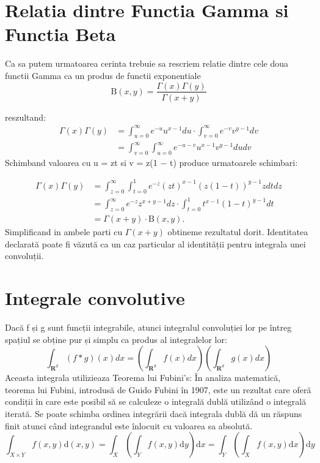 \documentclass[12pt]{caltech_thesis}
\begin{document}
\section{Relatia dintre Functia Gamma si Functia Beta}

Ca sa putem urmatoarea cerinta trebuie sa rescriem relatie dintre cele doua functii Gamma ca un produs de functii exponentiale
$$
\mathrm{B}(x, y)=\frac{\Gamma(x) \Gamma(y)}{\Gamma(x+y)}
$$

reszultand:
$$
\begin{aligned}
\Gamma(x) \Gamma(y) &=\int_{u=0}^{\infty} e^{-u} u^{x-1} d u \cdot \int_{v=0}^{\infty} e^{-v} v^{y-1} d v \\
&=\int_{v=0}^{\infty} \int_{u=0}^{\infty} e^{-u-v} u^{x-1} v^{y-1} d u d v
\end{aligned}
$$
Schimband valoarea cu u = zt si v = z(1 − t) produce urmatoarele schimbari:

$$
\begin{aligned}
\Gamma(x) \Gamma(y) &=\int_{z=0}^{\infty} \int_{t=0}^{1} e^{-z}(z t)^{x-1}(z(1-t))^{y-1} z d t d z \\
&=\int_{z=0}^{\infty} e^{-z} z^{x+y-1} d z \cdot \int_{t=0}^{1} t^{x-1}(1-t)^{y-1} d t \\
&=\Gamma(x+y) \cdot \mathrm{B}(x, y) .
\end{aligned}
$$
Simplificand in ambele parti cu \(\Gamma(x+y)\) obtineme rezultatul dorit.
Identitatea declarată poate fi văzută ca un caz particular al identității pentru integrala unei convoluții. 
\section{Integrale convolutive}
Dacă f și g sunt funcții integrabile, atunci integralul convoluției lor pe întreg spațiul se obține pur și simplu ca produs al integralelor lor:
$$
\int_{\mathbf{R}^{d}}(f * g)(x) d x=\left(\int_{\mathbf{R}^{d}} f(x) d x\right)\left(\int_{\mathbf{R}^{d}} g(x) d x\right)
$$
Aceasta integrala utilizieaza Teorema lui  Fubini's:
În analiza matematică, teorema lui Fubini, introdusă de Guido Fubini în 1907, este un rezultat care oferă condiții în care este posibil să se calculeze o integrală dublă utilizând o integrală iterată. Se poate schimba ordinea integrării dacă integrala dublă dă un răspuns finit atunci când integrandul este înlocuit cu valoarea sa absolută.
$$
\int_{X \times Y} f(x, y) \mathrm{d}(x, y)=\int_{X}\left(\int_{Y} f(x, y) \mathrm{d} y\right) \mathrm{d} x=\int_{Y}\left(\int_{X} f(x, y) \mathrm{d} x\right) \mathrm{d} y
$$
\end{document}
